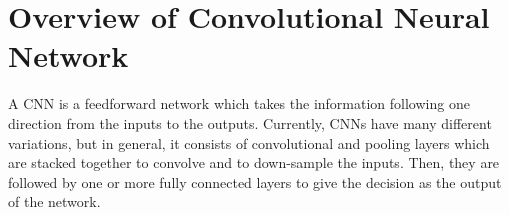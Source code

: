 \documentclass[review]{elsarticle}
\begin{document}


\section{Overview of Convolutional Neural Network}
\label{sOverview}
A CNN is a feedforward network which takes the information following one direction from the inputs to the outputs. Currently, CNNs have many different variations, but in general, it consists of convolutional and pooling layers which are stacked together to convolve and to down-sample the inputs. Then, they are followed by one or more fully connected layers to give the decision as the output of the network. 
\end{document}
